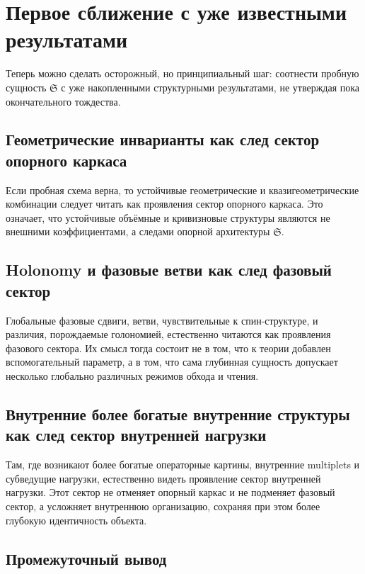 \documentclass[12pt,a4paper]{article}
\begin{document}
\section{Первое сближение с уже известными результатами}

Теперь можно сделать осторожный, но принципиальный шаг: соотнести пробную сущность \(\mathfrak{S}\) с уже накопленными структурными результатами, не утверждая пока окончательного тождества.

\subsection{Геометрические инварианты как след сектор опорного каркаса}

Если пробная схема верна, то устойчивые геометрические и квазигеометрические комбинации следует читать как проявления сектор опорного каркаса. Это означает, что устойчивые объёмные и кривизновые структуры являются не внешними коэффициентами, а следами опорной архитектуры \(\mathfrak{S}\).

\subsection{Holonomy и фазовые ветви как след фазовый сектор}

Глобальные фазовые сдвиги, ветви, чувствительные к спин-структуре, и различия, порождаемые голономией, естественно читаются как проявления фазового сектора. Их смысл тогда состоит не в том, что к теории добавлен вспомогательный параметр, а в том, что сама глубинная сущность допускает несколько глобально различных режимов обхода и чтения.

\subsection{Внутренние более богатые внутренние структуры как след сектор внутренней нагрузки}

Там, где возникают более богатые операторные картины, внутренние multiplets и субведущие нагрузки, естественно видеть проявление сектор внутренней нагрузки. Этот сектор не отменяет опорный каркас и не подменяет фазовый сектор, а усложняет внутреннюю организацию, сохраняя при этом более глубокую идентичность объекта.

\subsection{Промежуточный вывод}
\end{document}
